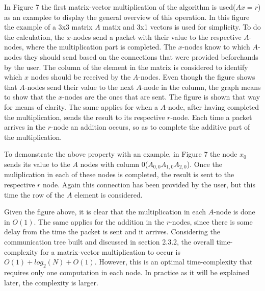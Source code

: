 \documentclass[12pt,a4paper]{article}
\begin{document}
In Figure 7 the first matrix-vector multiplication of the algorithm is used($Ax=r$) as an examplee to display the general overview of this operation. In this figure the example of a 3x3 matrix $A$ matix and 3x1 vectors is used for simplicity. To do the calculation, the $x$-nodes send a packet with their value to the respective $A$-nodes, where the multiplication part is completed. The $x$-nodes know to which $A$-nodes they should send based on the connections that were provided beforehands by the user. The column of the element in the matrix is considered to identify which $x$ nodes should be received by the $A$-nodes. Even though the figure shows that $A$-nodes send their value to the next $A$-node in the column, the graph means to show that the $x$-nodes are the ones that are sent. The figure is shown that way for means of clarity. The same applies for when a $A$-node, after having completed the multiplication, sends the result to its respective $r$-node. Each time a packet arrives in the $r$-node an addition occurs, so as to complete the additive part of the multiplication. 

To demonstrate the above property with an example, in Figure 7 the node $x_0$ sends its value to the $A$ nodes with column 0($A_{0,0} A_{1,0} A_{2,0}$). Once the muliplication in each of these nodes is completed, the result is sent to the respective $r$ node. Again this connection has been provided by the user, but this time the row of the $A$ element is  considered.

Given the figure above, it is clear that the multiplication in each $A$-node is done in $O(1)$. The same applies for the addition in the $r$-nodes, since there is some delay from the time the packet is sent and it arrives. Considering the communication tree built and discussed in section 2.3.2, the overall time-complexity for a matrix-vector multiplication to occur is $O(1)+log_2(N)+O(1)$. However, this is an optimal time-complexity that requires only one computation in each node. In practice as it will be explained later, the complexity is larger.
\end{document}
